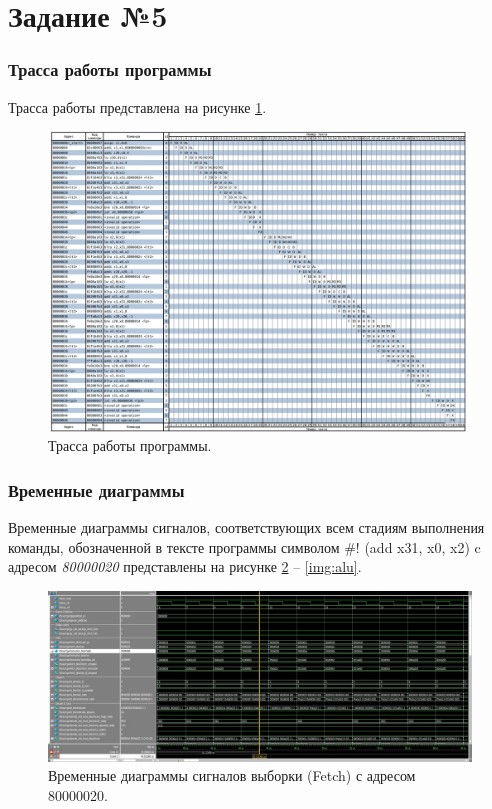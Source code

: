 \section{Задание №5}

\subsubsection*{Трасса работы программы}
Трасса работы представлена на рисунке \ref{img:pipeline}.

\begin{figure}[h]
	\centering
	\includegraphics[height=0.5\textheight]{img/pipeline}
	\caption{Трасса работы программы.}
	\label{img:pipeline}
\end{figure}

\subsubsection*{Временные диаграммы}
Временные диаграммы сигналов, соответствующих всем стадиям выполнения команды, обозначенной в тексте программы символом \#! (add x31, x0, x2) c адресом \textit{80000020} представлены на рисунке \ref{img:fetch} -- \ref{img:alu}.

\begin{figure}[h]
	\centering
	\includegraphics[height=0.3\textheight]{img/fetch}
	\caption{Временные диаграммы сигналов выборки (Fetch) с адресом 80000020.}
	\label{img:fetch}
\end{figure}

